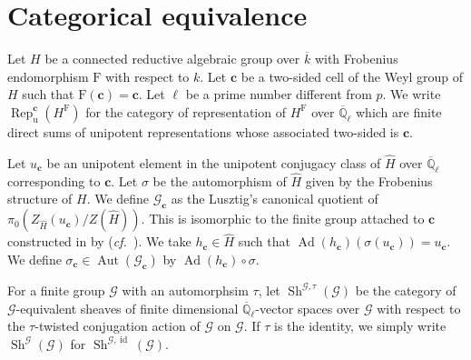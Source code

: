 \documentclass[12pt,a4paper]{article}
\newtheorem{conj}[thm]{Conjecture}
\DeclareMathOperator{\id}{id}
\DeclareMathOperator{\Rep}{Rep}
\DeclareMathOperator{\Aut}{Aut}
\DeclareMathOperator{\Irr}{Irr}
\DeclareMathOperator{\Ad}{Ad}
\DeclareMathOperator{\Sh}{Sh}
\newcommand{\cf}{\textit{cf.\ }}
\newcommand{\mb}{\mathbb}
\newcommand{\mc}{\mathcal}
\newcommand{\mr}{\mathrm}
\newcommand{\mbf}{\mathbf}
\newcommand{\ol}{\overline}
\newcommand{\wh}{\widehat}
\begin{document}

\section{Categorical equivalence}


Let $H$ be a connected reductive algebraic group over $\ol{k}$ with Frobenius endomorphism $\mr{F}$ with respect to $k$. 
Let $\mbf{c}$ be a two-sided cell of the Weyl group of $H$ such that $\mr{F}(\mbf{c})=\mbf{c}$. 
Let $\ell$ be a prime number different from $p$.  
We write $\Rep_{\mr{u}}^{\mbf{c}}(H^{\mr{F}})$ 
for the category of representation of $H^{\mr{F}}$ over $\ol{\mb{Q}}_{\ell}$ which are finite direct sums of unipotent representations whose associated two-sided is $\mbf{c}$. 

Let $u_{\mbf{c}}$ be an unipotent element in the unipotent conjugacy class of $\wh{H}$ over $\ol{\mb{Q}}_{\ell}$ corresponding to $\mbf{c}$. 
Let $\sigma$ be the automorphism of $\wh{H}$ given by the Frobenius structure of $H$. 
We define $\mc{G}_{\mbf{c}}$ as the Lusztig's canonical quotient of $\pi_0 (Z_{\wh{H}}(u_{\mbf{c}})/Z(\wh{H}))$. 
This is isomorphic to the finite group attached to $\mbf{c}$ constructed in \cite[Chapter 4]{LusChred} by \cite[(13.1.3)]{LusChred} (\cf \cite{LusFamSpr}). 
We take $h_{\mbf{c}} \in \wh{H}$ such that 
$\Ad (h_{\mbf{c}})(\sigma (u_{\mbf{c}}))=u_{\mbf{c}}$. 
We define $\sigma_{\mbf{c}} \in \Aut (\mc{G}_{\mbf{c}})$ by 
$\Ad (h_{\mbf{c}}) \circ \sigma$. 


For a finite group $\mc{G}$ with an automorphsim $\tau$, let $\Sh^{\mc{G},\tau}(\mc{G})$ be the category of 
$\mc{G}$-equivalent sheaves of finite dimensional $\ol{\mb{Q}}_{\ell}$-vector spaces over $\mc{G}$ with respect to the $\tau$-twisted conjugation action of $\mc{G}$ on $\mc{G}$. If $\tau$ is the identity, we simply write 
$\Sh^{\mc{G}}(\mc{G})$ for $\Sh^{\mc{G},\id}(\mc{G})$. 
\end{document}

